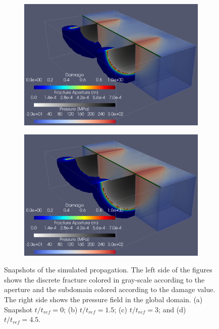 \begin{figure}[h]
\begin{subfigure}{.45\textwidth}
  \centering
  \includegraphics[width=\linewidth]{Chapter4/figures/3D/t_60.png}
  \caption{}
  \label{fig:parallel_t_2}
\end{subfigure}
\hspace{0.85cm}
\begin{subfigure}{.45\textwidth}
  \centering
  \includegraphics[width=\linewidth]{Chapter4/figures/3D/t_90.png}
  \caption{}
  \label{fig:parallel_t_3}
\end{subfigure}
  \caption{Snapshots of the simulated propagation. The left side of the figures shows the discrete fracture colored in gray-scale according to the aperture and the subdomain colored according to the damage value. The right side shows the pressure field in the global domain. (a) Snapshot $t/t_{ref} = 0$; (b) $t/t_{ref} = 1.5$; (c) $t/t_{ref} = 3$; and (d) $t/t_{ref} = 4.5$. } 
  \label{fig:parallel_snapshots}
\end{figure}

